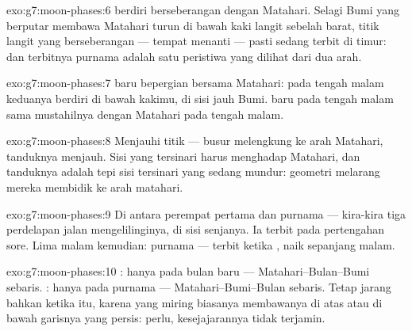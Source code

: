 \begin{solution}{exo:g7:moon-phases:6}
 berdiri berseberangan dengan Matahari. Selagi Bumi yang
berputar membawa Matahari turun di bawah kaki langit sebelah barat,
titik langit yang berseberangan --- tempat  menanti ---
pasti sedang terbit di timur:  dan terbitnya purnama
adalah satu peristiwa yang dilihat dari dua arah.
\end{solution}

\begin{solution}{exo:g7:moon-phases:7}
 baru bepergian bersama Matahari: pada tengah malam keduanya
berdiri di bawah kakimu, di sisi jauh Bumi.  baru pada tengah
malam sama mustahilnya dengan Matahari pada tengah malam.
\end{solution}

\begin{solution}{exo:g7:moon-phases:8}
Menjauhi titik  --- busur  melengkung ke
arah Matahari, tanduknya menjauh. Sisi yang tersinari harus menghadap
Matahari, dan tanduknya adalah tepi sisi tersinari yang sedang mundur:
geometri melarang mereka membidik ke arah matahari.
\end{solution}

\begin{solution}{exo:g7:moon-phases:9}
Di antara perempat pertama dan purnama --- kira-kira tiga perdelapan
jalan mengelilinginya, di sisi senjanya. Ia terbit pada pertengahan
sore. Lima malam kemudian: purnama --- terbit ketika ,
naik sepanjang malam.
\end{solution}

\begin{solution}{exo:g7:moon-phases:10}
: hanya pada bulan baru --- Matahari--Bulan--Bumi
sebaris. : hanya pada purnama ---
Matahari--Bumi--Bulan sebaris. Tetap jarang bahkan ketika itu, karena
  yang miring biasanya membawanya di atas atau di bawah
garisnya yang persis:  perlu, kesejajarannya tidak terjamin.
\end{solution}

